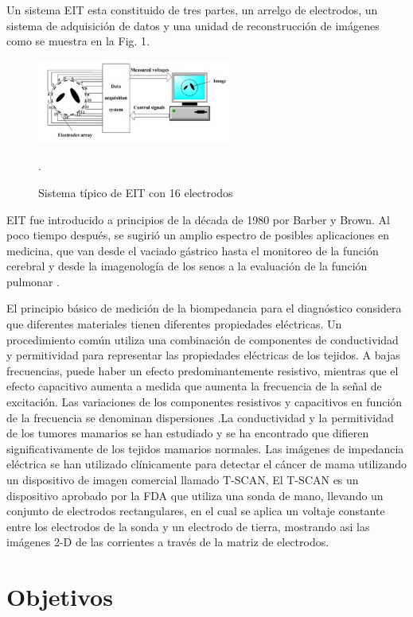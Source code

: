 \documentclass{IEEEtran}
\begin{document}
Un sistema EIT esta constituido de tres partes, un arrelgo de electrodos, un sistema de adquisición de datos y una unidad de reconstrucción de imágenes  como se muestra en la Fig. 1\cite{5962175}.

\begin{figure}[h!]
\centering
\includegraphics[width=2.5in]{EITsystem}
\caption{Sistema típico de EIT con 16 electrodos \cite{5962175}}\label{ref:FiguraB}.
\end{figure}
EIT fue introducido a principios de la década de 1980 por Barber y Brown. Al poco tiempo después, se sugirió un amplio espectro de posibles aplicaciones en medicina, que van desde el vaciado gástrico hasta el monitoreo de la función cerebral y desde la imagenología de los senos a la evaluación de la función pulmonar \cite{Teschner2015}.

El principio básico de medición de la biompedancia para el diagnóstico considera que diferentes materiales tienen diferentes propiedades eléctricas. Un procedimiento común utiliza una combinación de componentes de conductividad y permitividad para representar las propiedades eléctricas de los tejidos. A bajas frecuencias, puede haber un efecto predominantemente resistivo, mientras que el efecto capacitivo aumenta a medida que aumenta la frecuencia de la señal de excitación.
Las variaciones de los componentes resistivos y capacitivos en función de la frecuencia se denominan dispersiones \cite{Schwan2003}.La conductividad y la permitividad de los tumores mamarios se han estudiado y se ha encontrado que difieren significativamente de los tejidos mamarios normales.
Las imágenes de impedancia eléctrica se han utilizado clínicamente para detectar el cáncer de mama utilizando un dispositivo de imagen comercial llamado T-SCAN, El T-SCAN es un dispositivo aprobado por la FDA que utiliza una sonda de mano, llevando un conjunto de electrodos rectangulares, en el cual se aplica un voltaje constante entre los electrodos de la sonda y un electrodo de tierra, mostrando asi las imágenes 2-D de las corrientes a través de la
matriz de electrodos\cite{4132927}.

\section{Objetivos}
\end{document}
